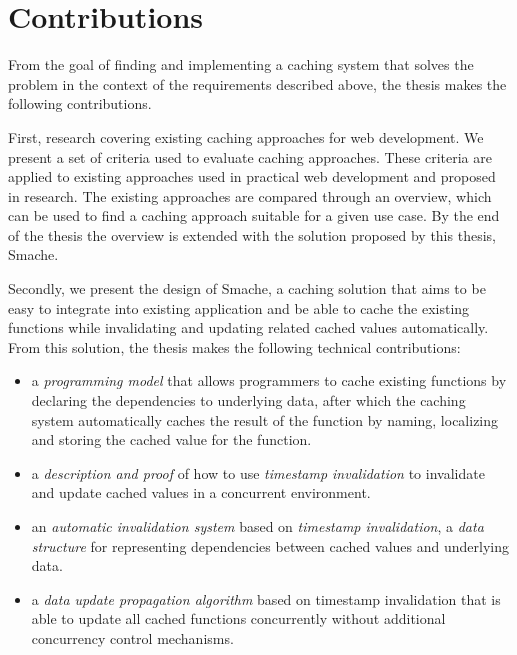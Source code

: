 

\section{Contributions}
\label{sec:contributions}

From the goal of finding and implementing a caching system that solves the problem in the context of the requirements described above, the thesis makes the following contributions.

First, research covering existing caching approaches for web development. We present a set of criteria used to evaluate caching approaches. These criteria are applied to existing approaches used in practical web development and proposed in research. The existing approaches are compared through an overview, which can be used to find a caching approach suitable for a given use case. By the end of the thesis the overview is extended with the solution proposed by this thesis, Smache.

Secondly, we present the design of Smache, a caching solution that aims to be easy to integrate into existing application and be able to cache the existing functions while invalidating and updating related cached values automatically. From this solution, the thesis makes the following technical contributions:

\begin{itemize}
  \item a \emph{programming model} that allows programmers to cache existing functions by declaring the dependencies to underlying data, after which the caching system automatically caches the result of the function by naming, localizing and storing the cached value for the function.
  \item a \emph{description and proof} of how to use \emph{timestamp invalidation} to invalidate and update cached values in a concurrent environment.
  \item an \emph{automatic invalidation system} based on \emph{timestamp invalidation}, a \emph{data structure} for representing dependencies between cached values and underlying data.
  \item a \emph{data update propagation algorithm} based on timestamp invalidation that is able to update all cached functions concurrently without additional concurrency control mechanisms.
\end{itemize}

